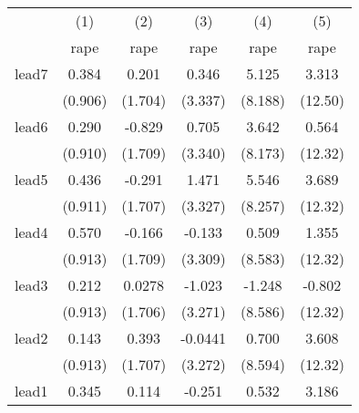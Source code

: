 {
\def\sym#1{\ifmmode^{#1}\else\(^{#1}\)\fi}
\begin{tabular}{l*{5}{c}}
\hline\hline
            &\multicolumn{1}{c}{(1)}&\multicolumn{1}{c}{(2)}&\multicolumn{1}{c}{(3)}&\multicolumn{1}{c}{(4)}&\multicolumn{1}{c}{(5)}\\
            &\multicolumn{1}{c}{rape}&\multicolumn{1}{c}{rape}&\multicolumn{1}{c}{rape}&\multicolumn{1}{c}{rape}&\multicolumn{1}{c}{rape}\\
\hline
lead7       &       0.384         &       0.201         &       0.346         &       5.125         &       3.313         \\
            &     (0.906)         &     (1.704)         &     (3.337)         &     (8.188)         &     (12.50)         \\
[1em]
lead6       &       0.290         &      -0.829         &       0.705         &       3.642         &       0.564         \\
            &     (0.910)         &     (1.709)         &     (3.340)         &     (8.173)         &     (12.32)         \\
[1em]
lead5       &       0.436         &      -0.291         &       1.471         &       5.546         &       3.689         \\
            &     (0.911)         &     (1.707)         &     (3.327)         &     (8.257)         &     (12.32)         \\
[1em]
lead4       &       0.570         &      -0.166         &      -0.133         &       0.509         &       1.355         \\
            &     (0.913)         &     (1.709)         &     (3.309)         &     (8.583)         &     (12.32)         \\
[1em]
lead3       &       0.212         &      0.0278         &      -1.023         &      -1.248         &      -0.802         \\
            &     (0.913)         &     (1.706)         &     (3.271)         &     (8.586)         &     (12.32)         \\
[1em]
lead2       &       0.143         &       0.393         &     -0.0441         &       0.700         &       3.608         \\
            &     (0.913)         &     (1.707)         &     (3.272)         &     (8.594)         &     (12.32)         \\
[1em]
lead1       &       0.345         &       0.114         &      -0.251         &       0.532         &       3.186         \\

\end{tabular}}
